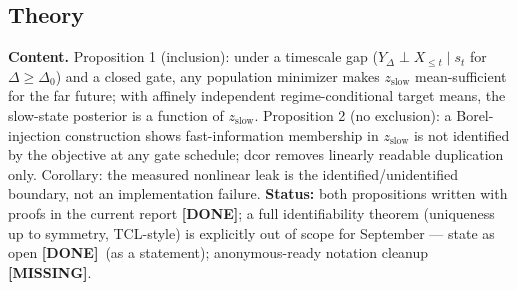 \documentclass[10pt]{article}
\newcommand{\done}{\textcolor[rgb]{0,0.45,0}{\textbf{[DONE]}}}
\newcommand{\todo}{\textcolor[rgb]{0.75,0,0}{\textbf{[MISSING]}}}
\newcommand{\zslow}{z_{\mathrm{slow}}}
\begin{document}
\subsection{Theory}
\textbf{Content.} Proposition 1 (inclusion): under a timescale gap
($Y_\Delta\perp X_{\le t}\mid s_t$ for $\Delta\ge\Delta_0$) and a closed
gate, any population minimizer makes $\zslow$ mean-sufficient for the far
future; with affinely independent regime-conditional target means, the
slow-state posterior is a function of $\zslow$. Proposition 2 (no
exclusion): a Borel-injection construction shows fast-information membership
in $\zslow$ is not identified by the objective at any gate schedule; dcor
removes linearly readable duplication only. Corollary: the measured
nonlinear leak is the identified/unidentified boundary, not an
implementation failure.
\textbf{Status:} both propositions written with proofs in the current report
\done; a full identifiability theorem (uniqueness up to symmetry, TCL-style)
is explicitly out of scope for September --- state as open \done\ (as a
statement); anonymous-ready notation cleanup \todo.
\end{document}
